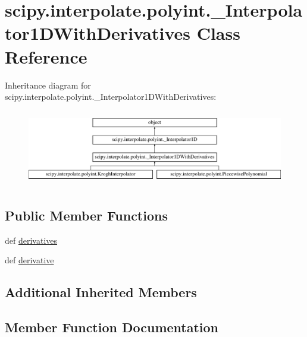 \hypertarget{classscipy_1_1interpolate_1_1polyint_1_1__Interpolator1DWithDerivatives}{}\section{scipy.\+interpolate.\+polyint.\+\_\+\+Interpolator1\+D\+With\+Derivatives Class Reference}
\label{classscipy_1_1interpolate_1_1polyint_1_1__Interpolator1DWithDerivatives}
Inheritance diagram for scipy.\+interpolate.\+polyint.\+\_\+\+Interpolator1\+D\+With\+Derivatives\+:\begin{figure}[H]
\begin{center}
\leavevmode
\includegraphics[height=3.363364cm]{classscipy_1_1interpolate_1_1polyint_1_1__Interpolator1DWithDerivatives}
\end{center}
\end{figure}
\subsection*{Public Member Functions}
\begin{DoxyCompactItemize}
\item 
def \hyperlink{classscipy_1_1interpolate_1_1polyint_1_1__Interpolator1DWithDerivatives_a049ca750798900348f7949c314891364}{derivatives}
\item 
def \hyperlink{classscipy_1_1interpolate_1_1polyint_1_1__Interpolator1DWithDerivatives_a4d30edd0af8d25f2aa92f03f4cc1700f}{derivative}
\end{DoxyCompactItemize}
\subsection*{Additional Inherited Members}


\subsection{Member Function Documentation}
\hypertarget{classscipy_1_1interpolate_1_1polyint_1_1__Interpolator1DWithDerivatives_a4d30edd0af8d25f2aa92f03f4cc1700f}{}
